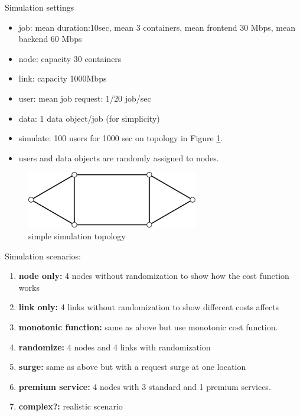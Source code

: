 
Simulation settings
\begin{itemize}
  \item		job: mean duration:10sec, mean 3 containers,
        mean frontend 30 Mbps, mean backend 60 Mbps
  \item		node: capacity 30 containers
  \item		link: capacity 1000Mbps
  \item		user: mean job request: 1/20 job/sec
  \item		data: 1 data object/job (for simplicity)
  \item		simulate: 100 users for 1000 sec on topology in Figure \ref{fig:topology-simple}.
  \item		users and data objects are randomly assigned to nodes.
\end{itemize}

\begin{figure}[htb]
  \begin{center}
    \includegraphics[width=7.5cm,clip]{topology-simple.pdf}
    \vspace{-2.0ex}
    \caption{simple simulation topology}
    \label{fig:topology-simple}
  \end{center}
\end{figure}

Simulation scenarios:

\begin{enumerate}
  \item	{\bf node only:} 4 nodes without randomization to show how the
        cost function works
  \item	{\bf link only:} 4 links without randomization to show
        different costs affects
  \item	{\bf monotonic function:} same as above but use monotonic cost
        function.
  \item	{\bf randomize:} 4 nodes and 4 links with randomization
  \item	{\bf surge:} same as above but with a request surge at one location
  \item {\bf premium service:} 4 nodes with 3 standard and 1 premium services.
  \item	{\bf complex?:} realistic scenario
\end{enumerate}
